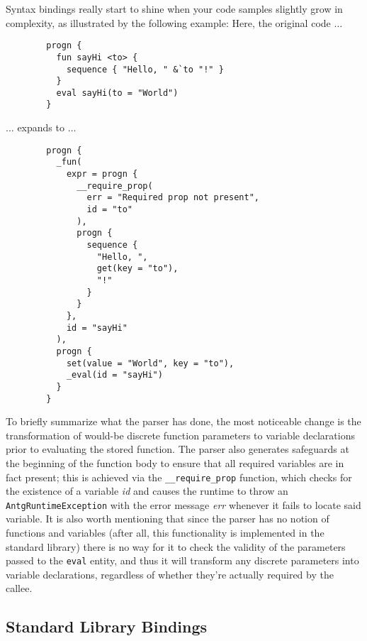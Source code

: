 \begin{multicols*}{2}
	Syntax bindings really start to shine when your code samples slightly grow in complexity, as illustrated by the following example:
	\vfill\columnbreak\noindent
	Here, the original code $\dots$
	\begin{verbatim}
		progn {
		  fun sayHi <to> {
		    sequence { "Hello, " &`to "!" }
		  }
		  eval sayHi(to = "World")
		}
	\end{verbatim}
	$\dots$ expands to $\dots$
	\begin{verbatim}
		progn {
		  _fun(
		    expr = progn {
		      __require_prop(
		        err = "Required prop not present",
		        id = "to"
		      ),
		      progn {
		        sequence {
		          "Hello, ",
		          get(key = "to"),
		          "!"
		        }
		      }
		    },
		    id = "sayHi"
		  ),
		  progn {
		    set(value = "World", key = "to"),
		    _eval(id = "sayHi")
		  }
		}
	\end{verbatim}
	To briefly summarize what the parser has done, the most noticeable change is the transformation of would-be
	discrete function parameters to variable declarations prior to evaluating the stored function.
	The parser also generates safeguards at the beginning of the function body to ensure that all required
	variables are in fact present; this is achieved via the \verb|__require_prop| function, which checks
	for the existence of a variable \textit{id} and causes the runtime to throw an \verb|AntgRuntimeException|
	with the error message \textit{err} whenever it fails to locate said variable.
	It is also worth mentioning that since the parser has no notion of functions and variables (after all, this functionality
	is implemented in the standard library) there is no way for it to check the validity of the parameters passed to the
	\verb|eval| entity, and thus it will transform any discrete parameters into variable declarations, regardless of whether
	they're actually required by the callee.
\end{multicols*}
\newpage

\subsection{Standard Library Bindings}

